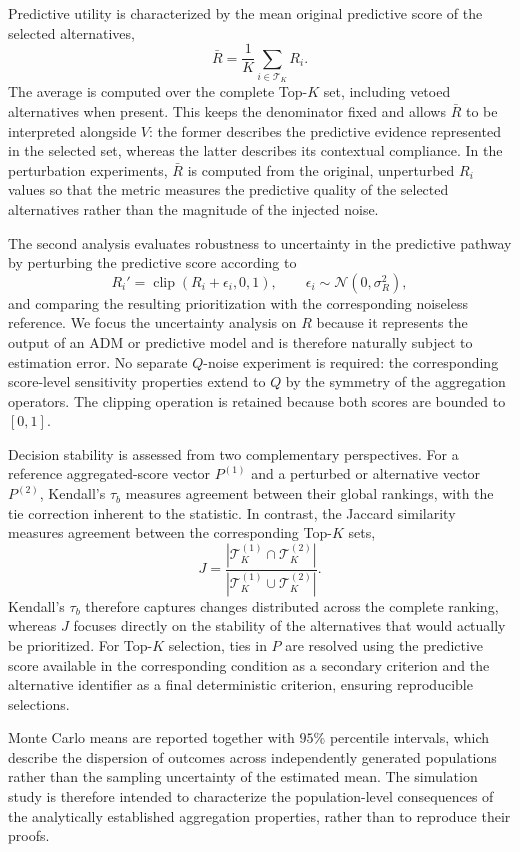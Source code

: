 \documentclass[mathematics,article,submit,moreauthors]{Definitions/mdpi}
\begin{document}
Predictive utility is characterized by the mean original predictive score of
the selected alternatives,
\[
\bar{R}=\frac{1}{K}\sum_{i\in\mathcal{T}_K}R_i.
\]
The average is computed over the complete Top-$K$ set, including vetoed
alternatives when present. This keeps the denominator fixed and allows
$\bar{R}$ to be interpreted alongside $V$: the former describes the
predictive evidence represented in the selected set, whereas the latter
describes its contextual compliance. In the perturbation experiments,
$\bar{R}$ is computed from the original, unperturbed $R_i$ values so that
the metric measures the predictive quality of the selected alternatives
rather than the magnitude of the injected noise.

The second analysis evaluates robustness to uncertainty in the predictive
pathway by perturbing the predictive score according to
\begin{equation}\label{eq:r-noise}
R_i'=\operatorname{clip}(R_i+\epsilon_i,0,1),
\qquad
\epsilon_i\sim\mathcal{N}(0,\sigma_R^2),
\end{equation}
and comparing the resulting prioritization with the corresponding noiseless
reference. We focus the uncertainty analysis on $R$ because it represents
the output of an ADM or predictive model and is therefore naturally subject
to estimation error. No separate $Q$-noise experiment is required: the
corresponding score-level sensitivity properties extend to $Q$ by the
symmetry of the aggregation operators. The clipping operation is retained
because both scores are bounded to $[0,1]$.

Decision stability is assessed from two complementary perspectives. For a
reference aggregated-score vector $P^{(1)}$ and a perturbed or alternative
vector $P^{(2)}$, Kendall's $\tau_b$ measures agreement between their global
rankings, with the tie correction inherent to the statistic. In contrast,
the Jaccard similarity measures agreement between the corresponding Top-$K$
sets,
\[
J=
\frac{|\mathcal{T}_K^{(1)}\cap\mathcal{T}_K^{(2)}|}
     {|\mathcal{T}_K^{(1)}\cup\mathcal{T}_K^{(2)}|}.
\]
Kendall's $\tau_b$ therefore captures changes distributed across the complete
ranking, whereas $J$ focuses directly on the stability of the alternatives
that would actually be prioritized. For Top-$K$ selection, ties in $P$ are
resolved using the predictive score available in the corresponding
condition as a secondary criterion and the alternative identifier as a final
deterministic criterion, ensuring reproducible selections.

Monte Carlo means are reported together with $95\%$ percentile intervals,
which describe the dispersion of outcomes across independently generated
populations rather than the sampling uncertainty of the estimated mean. The
simulation study is therefore intended to characterize the population-level
consequences of the analytically established aggregation properties, rather
than to reproduce their proofs.
\end{document}
